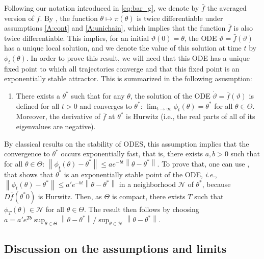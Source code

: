 \documentclass{article}
\newcommand{\calN}{\mathcal{N}}
\newcommand\norm[1]{\left\|#1\right\|}
\begin{document}
Following our notation introduced in \eqref{eq:bar_g}, we denote by $\bar{f}$ the averaged version of $f$. By \cite[Lemma~4]{allmeier2023bias}, the function $\theta\mapsto\pi(\theta)$ is twice differentiable under assumptions \ref{A:cont} and \ref{A:unichain}, which implies that the function $\bar{f}$ is also twice differentiable. This implies, for an initial $\vartheta(0)=\theta$, the ODE $\dot{\vartheta}=\bar{f}(\vartheta)$ has a unique local solution, and we denote the value of this solution at time $t$ by $\phi_t(\theta)$. In order to prove this result, we will need that this ODE has a unique fixed point  to which all trajectories converge and that this fixed point is an exponentially stable attractor. This is summarized in the following asusmption: 
\begin{enumerate}[label=(A\arabic*),resume]
    \item \label{A:attractor} There exists a $\theta^*$ such that for any $\theta$, the solution of the ODE $\dot{\vartheta}=\bar{f}(\vartheta)$ is defined for all $t>0$ and converges to $\theta^*$: $\lim_{t\to\infty}\phi_t(\theta)=\theta^*$ for all $\theta\in\Theta$. Moreover, the derivative of $\bar{f}$ at $\theta^*$ is Hurwitz (i.e., the real parts of all of its eigenvalues are negative). 
\end{enumerate}
By classical results on the stability of ODES, this assumption implies that the convergence to $\theta^*$ occurs exponentially fast, that is, there exists $a,b>0$ such that for all $\theta\in\Theta$: $\norm{\phi_t(\theta)-\theta^*} \le a e^{-b t}\norm{\theta-\theta^*}$. To prove that, one can use \cite[Theorem~4.13]{khalil_nonlinear_2002}, that shows that $\theta^*$ is an exponentially stable point of the ODE, \emph{i.e.}, $\norm{\phi_t(\theta)-\theta^*} \le a' e^{-b t}\norm{\theta-\theta^*}$ in a neighborhood $\calN$ of $\theta^*$, because $D\bar{f}(\theta^*0)$ is Hurwitz. Then, as $\Theta$ is compact, there exists $T$ such that $\phi_T(\theta)\in\calN$ for all $\theta\in\Theta$. The result then follows by choosing $a=a'e^{Tb}\sup_{\theta\in\Theta}\norm{\theta-\theta^*}/\sup_{\theta\in\calN}\norm{\theta-\theta^*}$.

\subsection{Discussion on the assumptions and limits}
\label{ssec:limits}
\end{document}
